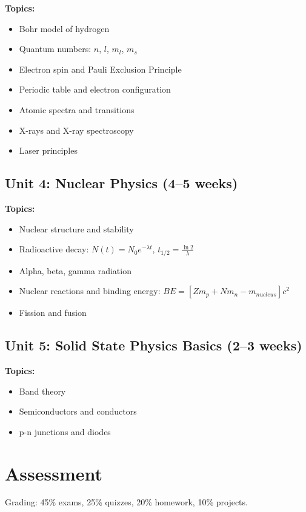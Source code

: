 \documentclass[12pt,oneside]{book}
\begin{document}
\textbf{Topics:}
\begin{itemize}
    \item Bohr model of hydrogen
    \item Quantum numbers: $n$, $l$, $m_l$, $m_s$
    \item Electron spin and Pauli Exclusion Principle
    \item Periodic table and electron configuration
    \item Atomic spectra and transitions
    \item X-rays and X-ray spectroscopy
    \item Laser principles
\end{itemize}

\subsection{Unit 4: Nuclear Physics (4--5 weeks)}

\textbf{Topics:}
\begin{itemize}
    \item Nuclear structure and stability
    \item Radioactive decay: $N(t) = N_0 e^{-\lambda t}$, $t_{1/2} = \frac{\ln 2}{\lambda}$
    \item Alpha, beta, gamma radiation
    \item Nuclear reactions and binding energy: $BE = [Zm_p + Nm_n - m_{nucleus}]c^2$
    \item Fission and fusion
\end{itemize}

\subsection{Unit 5: Solid State Physics Basics (2--3 weeks)}

\textbf{Topics:}
\begin{itemize}
    \item Band theory
    \item Semiconductors and conductors
    \item p-n junctions and diodes
\end{itemize}

\section{Assessment}

Grading: 45\% exams, 25\% quizzes, 20\% homework, 10\% projects.
\end{document}
